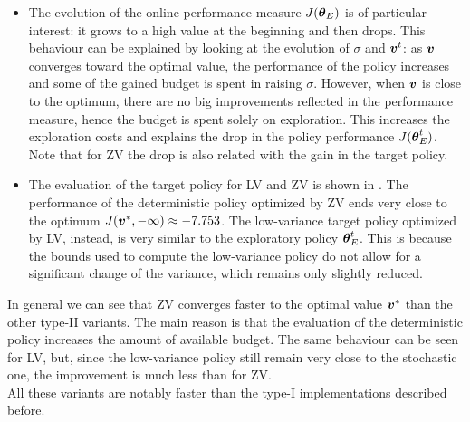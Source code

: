 \begin{itemize}
\item The evolution of the online performance measure $J({\boldsymbol{\theta}}_E)$ is of particular interest: it grows to a high value at the beginning and then drops. This behaviour can be explained by looking at the evolution of $\sigma$ and $\boldsymbol{v}^t$: as $\boldsymbol{v}$ converges toward the optimal value, the performance of the policy increases and some of the gained budget is spent in raising $\sigma$. However, when $\boldsymbol{v}$ is close to the optimum, there are no big improvements reflected in the performance measure, hence the budget is spent solely on exploration. This increases the exploration costs and explains the drop in the policy performance $J({\boldsymbol{\theta}}^t_E)$. Note that for ZV the drop is also related with the gain in the target policy.

\item The evaluation of the target policy for LV and ZV is shown in . The performance of the deterministic policy optimized by ZV ends very close to the optimum $J(\boldsymbol{v}^*,-\infty)\approx-7.753$. The low-variance target policy optimized by LV, instead, is very similar to the exploratory policy ${\boldsymbol{\theta}}^t_E$. This is because the bounds used to compute the low-variance policy do not allow for a significant change of the variance, which remains only slightly reduced. 
\end{itemize}

In general we can see that ZV converges faster to the optimal value $\boldsymbol{v}^*$ than the other type-II variants. The main reason is that the evaluation of the deterministic policy increases the amount of available budget. The same behaviour can be seen for LV, but, since the low-variance policy still remain very close to the stochastic one, the improvement is much less than for ZV. \\
All these variants are notably faster than the type-I implementations described before.


